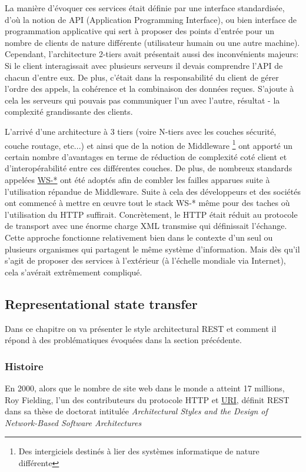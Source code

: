 La manière d'évoquer ces services était définie par une interface standardisée, d'où la notion de API (Application Programming Interface), ou bien interface de programmation applicative qui sert à proposer des points d'entrée pour un nombre de clients de nature différente (utilisateur humain ou une autre machine).
\\ 
Cependant, l'architecture 2-tiers avait présentait aussi des inconvénients majeurs:
Si le client interagissait avec plusieurs serveurs il devais comprendre l'API de chacun d'entre eux. De plus, c'était dans la responsabilité du client de gérer l'ordre des appels, la cohérence et la combinaison des données reçues. S'ajoute à cela les serveurs qui pouvais pas communiquer l'un avec l'autre, résultat - la complexité grandissante des clients. 


L'arrivé d'une architecture à 3 tiers (voire N-tiers avec les couches sécurité, couche routage, etc...) et ainsi que de la notion de Middleware \footnote{Des intergiciels destinés à lier des systèmes informatique de nature différente }  ont apporté un certain nombre d'avantages en terme de réduction de complexité coté client et d'interopérabilité entre ces différentes couches. De plus, de nombreux standards appelées \href{https://fr.wikipedia.org/wiki/Liste_des_sp%C3%A9cifications_des_services_web_WS-*}{WS-*} 
	ont été adoptés afin de combler les failles apparues suite à l'utilisation répandue de Middleware. 
Suite à cela des développeurs et des sociétés ont commencé à mettre en œuvre tout le stack WS-* même pour des taches où l'utilisation du HTTP suffirait. Concrètement,  le HTTP était réduit au protocole de transport avec une énorme charge XML transmise qui définissait l'échange. 
\\
Cette approche fonctionne relativement bien dans le contexte d'un seul ou plusieurs organismes qui partagent le même système d'information. Mais dès qu'il s'agit de proposer des services à l'extérieur (à l'échelle mondiale via Internet), cela s'avérait extrêmement compliqué. 
\newpage





\subsection{Representational state transfer}
Dans ce chapitre on va présenter le style architectural REST et comment il répond à des problématiques évoquées dans la section précédente. 
\subsubsection{Histoire}
En 2000, alors que le nombre de site web dans le monde a atteint 17 millions, Roy Fielding, l'un des contributeurs du protocole HTTP et \href{https://tools.ietf.org/html/rfc3986}{URI}, définit REST dans sa thèse de doctorat intitulée \emph{Architectural Styles and the Design of Network-Based Software Architectures} \cite{roythesis}






